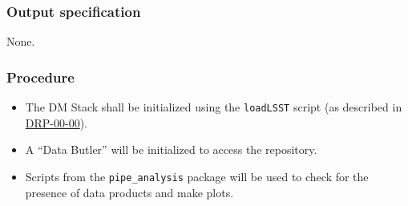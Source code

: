 \subsubsection{Output specification}

None.

\subsubsection{Procedure}

\begin{itemize}

  \item{The DM Stack shall be initialized using the \texttt{loadLSST} script
  (as described in \hyperref[drp-00-00]{DRP-00-00}).}

  \item{A ``Data Butler'' will be initialized to access the repository.}

  \item{Scripts from the \texttt{pipe\_analysis} package will be used to check for the presence of data products and make plots.}

\end{itemize}
